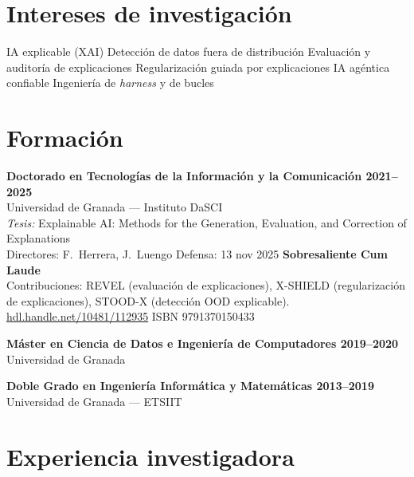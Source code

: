 \documentclass[10pt,a4paper]{article}
\newcommand{\blueitem}[1]{\textcolor{subtitleblue}{\textbf{#1}}}
\newcommand{\sub}[1]{\textcolor{subtle}{\footnotesize #1}}
\begin{document}
\section*{Intereses de investigación}

IA explicable (XAI) \quad\textbar\quad Detección de datos fuera de distribución \quad\textbar\quad Evaluación y auditoría de explicaciones \quad\textbar\quad Regularización guiada por explicaciones \quad\textbar\quad IA agéntica confiable \quad\textbar\quad Ingeniería de \textit{harness} y de bucles

\section*{Formación}

\blueitem{Doctorado en Tecnologías de la Información y la Comunicación \hfill 2021--2025} \\
\sub{Universidad de Granada --- Instituto DaSCI} \\
\textit{Tesis:} Explainable AI: Methods for the Generation, Evaluation, and Correction of Explanations \\
\sub{Directores: F.~Herrera, J.~Luengo \quad Defensa: 13 nov 2025 \quad \textbf{Sobresaliente Cum Laude}} \\
\sub{Contribuciones: REVEL (evaluación de explicaciones), X-SHIELD (regularización de explicaciones), STOOD-X (detección OOD explicable).} \\
\sub{\href{https://hdl.handle.net/10481/112935}{hdl.handle.net/10481/112935} \quad ISBN 9791370150433}

\vspace{0.2em}

\blueitem{Máster en Ciencia de Datos e Ingeniería de Computadores \hfill 2019--2020} \\
\sub{Universidad de Granada}

\vspace{0.2em}

\blueitem{Doble Grado en Ingeniería Informática y Matemáticas \hfill 2013--2019} \\
\sub{Universidad de Granada --- ETSIIT}

\section*{Experiencia investigadora}
\end{document}
